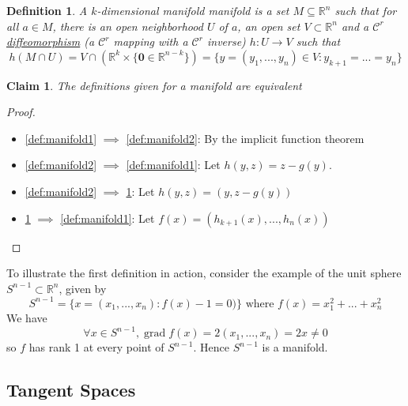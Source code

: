 \documentclass{article}
\newtheorem{definition}{Definition}
\newtheorem{claim}{Claim}
\DeclareMathOperator{\grad}{grad}
\newcommand{\reals}[0]{\mathbb{R}}
\newcommand{\mc}[1]{\mathcal{#1}}
\newcommand{\mb}[1]{\mathbf{#1}}
\begin{document}
\begin{definition}
  A \(k\)-dimensional manifold manifold is a set \(M \subseteq \reals^n\) such that for all \(a \in M\), there is an open neighborhood \(U\) of \(a\), an open set \(V \subset \reals^n\) and a \(\mc{C}^r\) \underline{diffeomorphism} (a \(\mc{C}^r\) mapping with a \(\mc{C}^r\) inverse) \(h: U \to V\) such that
  \begin{equation}h(M \cap U) = V \cap (\reals^k \times \{\mb{0} \in \reals^{n - k}\}) =
  \{y = (y_1,...,y_n) \in V : y_{k + 1} = ... = y_n\}\end{equation}
  \label{def:manifold3}
\end{definition}
\begin{claim}
  The definitions given for a manifold are equivalent
\end{claim}
\begin{proof}
\begin{itemize}

  \item \ref{def:manifold1} \(\implies\) \ref{def:manifold2}: By the implicit function theorem

  \item \ref{def:manifold2} \(\implies\) \ref{def:manifold1}: Let \(h(y, z) = z - g(y)\).

  \item \ref{def:manifold2} \(\implies\) \ref{def:manifold3}: Let \(h(y, z) = (y, z - g(y))\)

  \item \ref{def:manifold3} \(\implies\) \ref{def:manifold1}: Let \(f(x) = (h_{k + 1}(x),...,h_n(x))\)

\end{itemize}
\end{proof}

To illustrate the first definition in action, consider the example of the unit sphere \(S^{n - 1} \subset \reals^n\), given by
\begin{equation}S^{n - 1} = \{x = (x_1,...,x_n) : f(x) - 1 = 0)\} \text{ where } f(x) = x_1^2 + ... + x_n^2\end{equation}
We have
\begin{equation}\forall x \in S^{n - 1}, \grad f(x) = 2(x_1,...,x_n) = 2x \neq 0\end{equation}
so \(f\) has rank 1 at every point of \(S^{n - 1}\). Hence \(S^{n - 1}\) is a manifold.

\subsection{Tangent Spaces}
\end{document}
